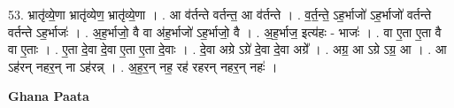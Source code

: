 \documentclass[17pt]{extarticle}
\begin{document}
53. भ्रातृ॑व्ये॒णा भ्रातृ॑व्येण॒ भ्रातृ॑व्ये॒णा । . आ व॑र्तन्ते वर्तन्त॒ आ व॑र्तन्ते । . व॒र्त॒न्ते॒ ऽह॒र्भाजो॑ ऽह॒र्भाजो॑ वर्तन्ते वर्तन्ते ऽह॒र्भाजः॑ । . अ॒ह॒र्भाजो॒ वै वा अ॑ह॒र्भाजो॑ ऽह॒र्भाजो॒ वै । . अ॒ह॒र्भाज॒ इत्य॑हः - भाजः॑ । . वा ए॒ता ए॒ता वै वा ए॒ताः । . ए॒ता दे॒वा दे॒वा ए॒ता ए॒ता दे॒वाः । . दे॒वा अग्रे ऽग्रे॑ दे॒वा दे॒वा अग्रे᳚ । . अग्र॒ आ ऽग्रे ऽग्र॒ आ । . आ ऽह॑रन् नहर॒न् ना ऽह॑रन्न् । . अ॒ह॒र॒न् नह॒ रह॑ रहरन् नहर॒न् नहः॑ । \newline

\textbf{Ghana Paata } \newline
\end{document}
